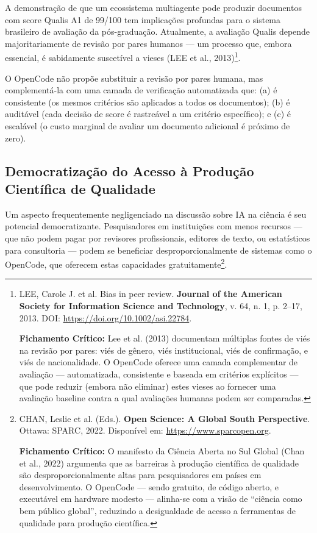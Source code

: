 A demonstração de que um ecossistema multiagente pode produzir documentos com score Qualis A1 de 99/100 tem implicações profundas para o sistema brasileiro de avaliação da pós-graduação. Atualmente, a avaliação Qualis depende majoritariamente de revisão por pares humanos --- um processo que, embora essencial, é sabidamente suscetível a vieses (LEE et al., 2013)\footnote{
  LEE, Carole J. et al. Bias in peer review. \textbf{Journal of the American Society for Information Science and Technology}, v. 64, n. 1, p. 2--17, 2013. DOI: \url{https://doi.org/10.1002/asi.22784}.

  \textbf{Fichamento Crítico:} Lee et al. (2013) documentam múltiplas fontes de viés na revisão por pares: viés de gênero, viés institucional, viés de confirmação, e viés de nacionalidade. O OpenCode oferece uma camada complementar de avaliação --- automatizada, consistente e baseada em critérios explícitos --- que pode reduzir (embora não eliminar) estes vieses ao fornecer uma avaliação baseline contra a qual avaliações humanas podem ser comparadas.
}.

O OpenCode não propõe substituir a revisão por pares humana, mas complementá-la com uma camada de verificação automatizada que: (a) é consistente (os mesmos critérios são aplicados a todos os documentos); (b) é auditável (cada decisão de score é rastreável a um critério específico); e (c) é escalável (o custo marginal de avaliar um documento adicional é próximo de zero).

\subsection{Democratização do Acesso à Produção Científica de Qualidade}

Um aspecto frequentemente negligenciado na discussão sobre IA na ciência é seu potencial democratizante. Pesquisadores em instituições com menos recursos --- que não podem pagar por revisores profissionais, editores de texto, ou estatísticos para consultoria --- podem se beneficiar desproporcionalmente de sistemas como o OpenCode, que oferecem estas capacidades gratuitamente\footnote{
  CHAN, Leslie et al. (Eds.). \textbf{Open Science: A Global South Perspective}. Ottawa: SPARC, 2022. Disponível em: \url{https://www.sparcopen.org}.

  \textbf{Fichamento Crítico:} O manifesto da Ciência Aberta no Sul Global (Chan et al., 2022) argumenta que as barreiras à produção científica de qualidade são desproporcionalmente altas para pesquisadores em países em desenvolvimento. O OpenCode --- sendo gratuito, de código aberto, e executável em hardware modesto --- alinha-se com a visão de ``ciência como bem público global'', reduzindo a desigualdade de acesso a ferramentas de qualidade para produção científica.
}.

